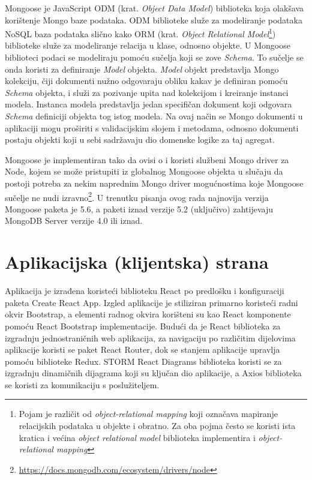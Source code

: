 \documentclass[times, utf8, diplomski, numeric]{fer}
\begin{document}
Mongoose je JavaScript ODM (krat. \emph{Object Data Model}) biblioteka koja olakšava korištenje Mongo baze podataka.
ODM biblioteke služe za modeliranje podataka NoSQL baza podataka slično kako ORM (krat. \emph{Object Relational Model}\footnote{
    Pojam je različit od \emph{object-relational mapping} koji označava mapiranje relacijskih podataka u objekte i obratno. Za oba pojma često se koristi ista kratica i većina \emph{object relational model} biblioteka implementira i \emph{object-relational mapping}
}) biblioteke služe za modeliranje relacija u klase, odnosno objekte. U Mongoose biblioteci podaci se modeliraju pomoću sučelja koji se zove \emph{Schema}.
To sučelje se onda koristi za definiranje \emph{Model} objekta.
\emph{Model} objekt predstavlja Mongo kolekciju, čiji dokumenti nužno odgovaraju obliku kakav je definiran pomoću \emph{Schema} objekta, i služi za pozivanje upita nad kolekcijom i kreiranje instanci modela.
Instanca modela predstavlja jedan specifičan dokument koji odgovara \emph{Schema} definiciji objekta tog istog modela.
Na ovaj način se Mongo dokumenti u aplikaciji mogu proširiti s validacijskim slojem i metodama, odnosno dokumenti postaju objekti koji u sebi sadržavaju dio domenske logike za taj agregat\citep{mongoose}.

Mongoose je implementiran tako da ovisi o i koristi službeni Mongo driver za Node, kojem se može pristupiti iz globalnog Mongoose objekta u slučaju da postoji potreba za nekim naprednim Mongo driver mogućnostima koje Mongoose sučelje ne nudi izravno\footnote{\url{https://docs.mongodb.com/ecosystem/drivers/node}}.
U trenutku pisanja ovog rada najnovija verzija Mongoose paketa je 5.6, a paketi iznad verzije 5.2 (uključivo) zahtijevaju MongoDB Server verzije 4.0 ili iznad.



\newpage
\section{Aplikacijska (klijentska) strana}

Aplikacija je izrađena koristeći biblioteku React po predlošku i konfiguraciji paketa Create React App.
Izgled aplikacije je stiliziran primarno koristeći radni okvir  Bootstrap, a elementi radnog okvira korišteni su kao React komponente pomoću React Bootstrap implementacije.
Budući da je React biblioteka za izgradnju jednostraničnih  web aplikacija, za navigaciju po različitim dijelovima aplikacije koristi se paket React Router, dok se stanjem aplikacije upravlja pomoću biblioteke Redux.
STORM React Diagrams biblioteka koristi se za izgradnju dinamičnih dijagrama koji su ključan dio aplikacije, a Axios biblioteka se koristi za komunikaciju s poslužiteljem.
\end{document}
